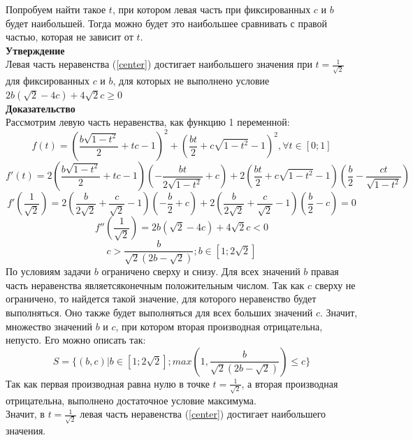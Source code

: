 Попробуем найти такое $t$, при котором левая часть при фиксированных $c$ и $b$ будет наибольшей. Тогда можно будет это наибольшее сравнивать с правой частью, которая не зависит от $t$. \\
\textbf{Утверждение}\\
Левая часть неравенства (\ref{center}) достигает наибольшего значения при $t=\frac{1}{\sqrt{2}}$ для фиксированных $c$ и $b$, для которых не выполнено условие $2 b (\sqrt{2} - 4 c) + 4 \sqrt{2} c \geq 0$\\
\textbf{Доказательство}\\
Рассмотрим левую часть неравенства, как функцию 1 переменной:
\begin{equation}
f(t)=( \frac{b\sqrt{1-t^2}}{2}+tc - 1)^2 + (\frac{bt}{2}+c\sqrt{1-t^2}-1)^2, \forall t \in [0;1]
\end{equation}
\begin{equation}
f'(t)=2( \frac{b\sqrt{1-t^2}}{2}+tc - 1)(-\frac{bt}{2\sqrt{1-t^2}}+c)+2(\frac{bt}{2}+c\sqrt{1-t^2}-1)(\frac{b}{2}-\frac{ct}{\sqrt{1-t^2}})
\end{equation}
\begin{equation}
f'(\frac{1}{\sqrt{2}})=2( \frac{b}{2\sqrt{2}}+\frac{c}{\sqrt{2}} - 1)(-\frac{b}{2}+c)+2(\frac{b}{2\sqrt{2}}+\frac{c}{\sqrt{2}}-1)(\frac{b}{2}-c)=0
\end{equation}
\begin{equation}
f''(\frac{1}{\sqrt{2}})=2 b (\sqrt{2} - 4 c) + 4 \sqrt{2} c < 0
\end{equation}
\begin{equation}
c>\frac{b}{\sqrt{2}(2b-\sqrt{2})}; b\in[1;2\sqrt{2}]
\end{equation}
По условиям задачи $b$ ограничено сверху и снизу. Для всех значений $b$ правая часть неравенства являетсяконечным положительным числом. Так как $c$ сверху не ограничено, то найдется такой значение, для которого неравенство будет выполняться. Оно также будет выполняться для всех больших значений $c$. Значит, множество значений $b$ и $c$, при котором вторая производная отрицательна, непусто. Его можно описать так:
\begin{equation}
S=\{(b,c) | b \in [1;2\sqrt{2}]; max(1,\frac{b}{\sqrt{2}(2b-\sqrt{2})}) \leq c \}
\end{equation}
Так как первая производная равна нулю в точке $t=\frac{1}{\sqrt{2}}$, а вторая производная отрицательна, выполнено достаточное условие максимума. \\
Значит, в $t=\frac{1}{\sqrt{2}}$ левая часть неравенства (\ref{center}) достигает наибольшего значения. \\

